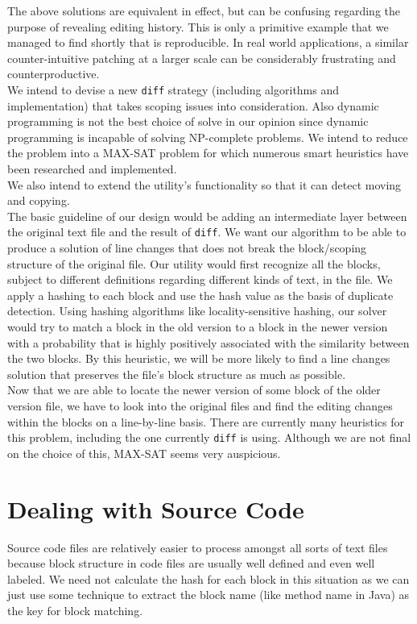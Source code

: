 \documentclass{article}
\begin{document}
The above solutions are equivalent in effect, but can be confusing regarding the purpose of revealing editing history. This is only a primitive example that we managed to find shortly that is reproducible. In real world applications, a similar counter-intuitive patching at a larger scale can be considerably frustrating and counterproductive.\\

We intend to devise a new \texttt{diff} strategy (including algorithms and implementation) that takes scoping issues into consideration. Also dynamic programming is not the best choice of solve in our opinion since dynamic programming is incapable of solving NP-complete problems. We intend to reduce the problem into a MAX-SAT problem for which numerous smart heuristics have been researched and implemented.\\

We also intend to extend the utility's functionality so that it can detect moving and copying.\\

The basic guideline of our design would be adding an intermediate layer between the original text file and the result of \texttt{diff}. We want our algorithm to be able to produce a solution of line changes that does not break the block/scoping structure of the original file. Our utility would first recognize all the blocks, subject to different definitions regarding different kinds of text, in the file. We apply a hashing to each block and use the hash value as the basis of duplicate detection. Using hashing algorithms like locality-sensitive hashing, our solver would try to match a block in the old version to a block in the newer version with a probability that is highly positively associated with the similarity between the two blocks. By this heuristic, we will be more likely to find a line changes solution that preserves the file's block structure as much as possible.\\

Now that we are able to locate the newer version of some block of the older version file, we have to look into the original files and find the editing changes within the blocks on a line-by-line basis. There are currently many heuristics for this problem, including the one currently \texttt{diff} is using. Although we are not final on the choice of this, MAX-SAT seems very auspicious.

\section{Dealing with Source Code}
Source code files are relatively easier to process amongst all sorts of text files because block structure in code files are usually well defined and even well labeled. We need not calculate the hash for each block in this situation as we can just use some technique to extract the block name (like method name in Java) as the key for block matching.\\
\end{document}
